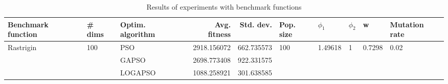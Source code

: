 \begin{table}
\centering
\caption{Results of experiments with benchmark functions}
\begin{tabular}{lllrrlllll}
\toprule
        Benchmark function &              \# dims & Optim. algorithm &  Avg. fitness &  Std. dev. &            Pop. size &               $\phi_{1}$ &         $\phi_{2}$ &                       w &         Mutation rate \\
\midrule
\multirow{3}{*}{Rastrigin} & \multirow{3}{*}{100} &              PSO &   2918.156072 & 662.735573 & \multirow{3}{*}{100} & \multirow{3}{*}{1.49618} & \multirow{3}{*}{1} & \multirow{3}{*}{0.7298} & \multirow{3}{*}{0.02} \\
                           &                      &            GAPSO &   2698.773408 & 922.331575 &                      &                          &                    &                         &                       \\
                           &                      &          LOGAPSO &   1088.258921 & 301.638585 &                      &                          &                    &                         &                       \\
\bottomrule
\end{tabular}
\end{table}
